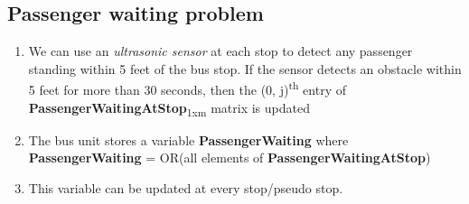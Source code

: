 \subsection{Passenger waiting problem}

\begin{enumerate}

    \item We can use an \textit{\gls{ultrasonic sensor}} at each stop to detect any passenger standing within 5 feet of the bus stop. If the sensor detects an obstacle within 5 feet for more than 30 seconds, then the (0, j)\textsuperscript{th} entry of \textbf{PassengerWaitingAtStop}\textsubscript{1xm} matrix is updated
    \item The bus unit stores a variable \textbf{PassengerWaiting} where\\
          \textbf{PassengerWaiting} = OR(all elements of \textbf{PassengerWaitingAtStop})
    \item This variable can be updated at every stop/pseudo stop.

\end{enumerate}